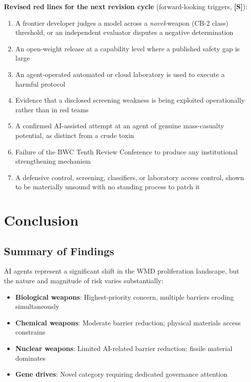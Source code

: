 \documentclass[11pt,letterpaper]{article}
\begin{document}
\textbf{Revised red lines for the next revision cycle} (forward-looking triggers, \textbf{[S]}):
\begin{enumerate}[nosep]
  \item A frontier developer judges a model across a \textit{novel}-weapon (CB-2 class) threshold, or an independent evaluator disputes a negative determination
  \item An open-weight release at a capability level where a published safety gap is large
  \item An agent-operated automated or cloud laboratory is used to execute a harmful protocol
  \item Evidence that a disclosed screening weakness is being exploited operationally rather than in red teams
  \item A confirmed AI-assisted attempt at an agent of genuine mass-casualty potential, as distinct from a crude toxin
  \item Failure of the BWC Tenth Review Conference to produce any institutional strengthening mechanism
  \item A defensive control, screening, classifiers, or laboratory access control, shown to be materially unsound with no standing process to patch it
\end{enumerate}

\section{Conclusion}

\subsection{Summary of Findings}

AI agents represent a significant shift in the WMD proliferation landscape, but the nature and magnitude of risk varies substantially:

\begin{itemize}
  \item \textbf{Biological weapons}: Highest-priority concern, multiple barriers eroding simultaneously
  \item \textbf{Chemical weapons}: Moderate barrier reduction; physical materials access constrains
  \item \textbf{Nuclear weapons}: Limited AI-related barrier reduction; fissile material dominates
  \item \textbf{Gene drives}: Novel category requiring dedicated governance attention
\end{itemize}
\end{document}
